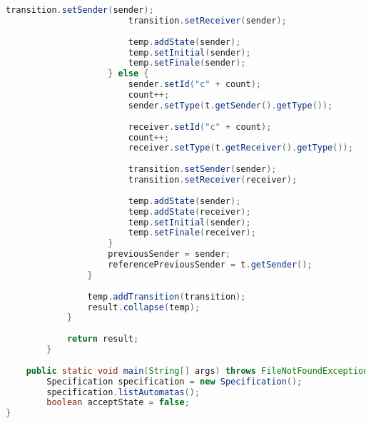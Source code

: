 \begin{lstlisting}[language=java, caption={Specification osztály.},captionpos=b]
                        transition.setSender(sender);
                        transition.setReceiver(sender);
    
                        temp.addState(sender);
                        temp.setInitial(sender);
                        temp.setFinale(sender);
                    } else {
                        sender.setId("c" + count);
                        count++;
                        sender.setType(t.getSender().getType());
    
                        receiver.setId("c" + count);
                        count++;
                        receiver.setType(t.getReceiver().getType());
    
                        transition.setSender(sender);
                        transition.setReceiver(receiver);
    
                        temp.addState(sender);
                        temp.addState(receiver);
                        temp.setInitial(sender);
                        temp.setFinale(receiver);
                    }
                    previousSender = sender;
                    referencePreviousSender = t.getSender();
                }
    
                temp.addTransition(transition);
                result.collapse(temp);
            }
    
            return result;
        }
	
	public static void main(String[] args) throws FileNotFoundException, UnsupportedEncodingException{
		Specification specification = new Specification();
		specification.listAutomatas();
		boolean acceptState = false;
}
\end{lstlisting}